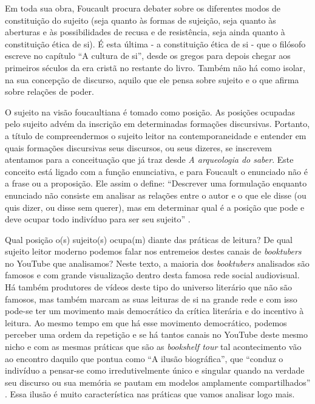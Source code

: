 Em toda sua obra, Foucault procura debater sobre os diferentes modos de
constituição do sujeito (seja quanto às formas de sujeição, seja quanto
às aberturas e às possibilidades de recusa e de resistência, seja ainda
quanto à constituição ética de si). É esta última - a constituição ética
de si - que o filósofo escreve no capítulo \enquote{A cultura de si}, desde os
gregos para depois chegar aos primeiros séculos da era cristã no
restante do livro. Também não há como isolar, na sua concepção de
discurso, aquilo que ele pensa sobre sujeito e o que afirma sobre
relações de poder.

O sujeito na visão foucaultiana é tomado como posição. As posições
ocupadas pelo sujeito advém da inscrição em determinadas formações
discursivas. Portanto, a título de compreendermos o sujeito leitor na
contemporaneidade e entender em quais formações discursivas seus
discursos, ou seus dizeres, se inscrevem atentamos para a conceituação
que \textcite{foucault2009arqueologia} já traz desde \textit{A arqueologia do saber}. Este conceito está ligado com a função enunciativa, e para Foucault o enunciado não é a frase ou a proposição. Ele assim o define: \enquote{Descrever uma formulação enquanto enunciado não consiste em analisar as relações entre o autor e o que ele disse (ou quis dizer, ou disse sem querer), mas em determinar
qual é a posição que pode e deve ocupar todo indivíduo para ser seu
sujeito} \cite[p. 108]{foucault2009arqueologia}.

Qual posição o(s) sujeito(s) ocupa(m) diante das práticas de leitura?
De qual sujeito leitor moderno podemos falar nos entremeios destes
canais de \textit{booktubers} no YouTube que analisamos? Neste texto, a
maioria dos \textit{booktubers} analisados são famosos e com grande
visualização dentro desta famosa rede social audiovisual. Há também
produtores de vídeos deste tipo do universo literário que não são
famosos, mas também marcam as suas leituras de si na grande rede e com
isso pode-se ter um movimento mais democrático da crítica literária e do
incentivo à leitura. Ao mesmo tempo em que há esse movimento
democrático, podemos perceber uma ordem da repetição e se há tantos
canais no YouTube deste mesmo nicho e com as mesmas práticas que são as
\textit{bookshelf tour} tal acontecimento vão ao encontro daquilo que
\textcite{chartier2019lersem} pontua como \enquote{A ilusão biográfica}, que \enquote{conduz o indivíduo a pensar-se como irredutivelmente único e singular quando na verdade seu discurso ou sua memória se pautam em modelos amplamente compartilhados} \cite[p. 8]{chartier2019lersem}. Essa ilusão é muito característica nas práticas que vamos analisar logo mais.

